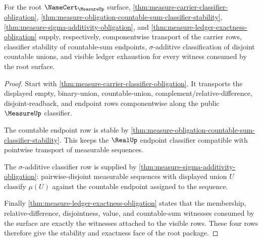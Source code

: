 \begin{theorem}
\label{thm:measure-root-namecert-stability-exactness}
For the root $\NameCert_{\MeasureUp}$ surface,
\autoref{thm:measure-carrier-classifier-obligation},
\autoref{thm:measure-obligation-countable-sum-classifier-stability},
\autoref{thm:measure-sigma-additivity-obligation}, and
\autoref{thm:measure-ledger-exactness-obligation} supply, respectively,
componentwise transport of the carrier rows, classifier stability of
countable-sum endpoints, $\sigma$-additive classification of disjoint
countable unions, and visible ledger exhaustion for every witness consumed by
the root surface.
\end{theorem}
\begin{proof}
Start with \autoref{thm:measure-carrier-classifier-obligation}. It transports
the displayed empty, binary-union, countable-union,
complement/relative-difference, disjoint-readback, and endpoint rows
componentwise along the public $\MeasureUp$ classifier.

The countable endpoint row is stable by
\autoref{thm:measure-obligation-countable-sum-classifier-stability}. This
keeps the $\RealUp$ endpoint classifier compatible with pointwise transport of
measurable sequences.

The $\sigma$-additive classifier row is supplied by
\autoref{thm:measure-sigma-additivity-obligation}: pairwise-disjoint
measurable sequences with displayed union $U$ classify $\mu(U)$ against the
countable endpoint assigned to the sequence.

Finally \autoref{thm:measure-ledger-exactness-obligation} states that the
membership, relative-difference, disjointness, value, and countable-sum
witnesses consumed by the surface are exactly the witnesses attached to the
visible rows. These four rows therefore give the stability and exactness face
of the root package.
\end{proof}

